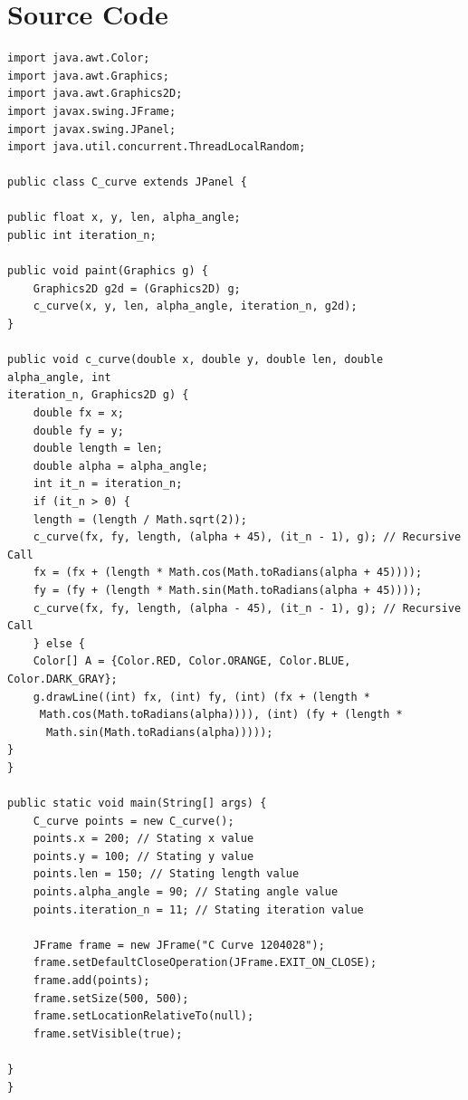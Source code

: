 \documentclass[11pt]{report}
\begin{document}
\section{Source Code}
\begin{lstlisting}
import java.awt.Color;
import java.awt.Graphics;
import java.awt.Graphics2D;
import javax.swing.JFrame;
import javax.swing.JPanel;
import java.util.concurrent.ThreadLocalRandom;

public class C_curve extends JPanel {

public float x, y, len, alpha_angle;
public int iteration_n;

public void paint(Graphics g) {
	Graphics2D g2d = (Graphics2D) g;
	c_curve(x, y, len, alpha_angle, iteration_n, g2d);
}

public void c_curve(double x, double y, double len, double alpha_angle, int 
iteration_n, Graphics2D g) {
	double fx = x; 
	double fy = y;
	double length = len;
	double alpha = alpha_angle;
	int it_n = iteration_n;
	if (it_n > 0) {
	length = (length / Math.sqrt(2));
	c_curve(fx, fy, length, (alpha + 45), (it_n - 1), g); // Recursive Call
	fx = (fx + (length * Math.cos(Math.toRadians(alpha + 45))));
	fy = (fy + (length * Math.sin(Math.toRadians(alpha + 45))));
	c_curve(fx, fy, length, (alpha - 45), (it_n - 1), g); // Recursive Call
	} else {
	Color[] A = {Color.RED, Color.ORANGE, Color.BLUE, Color.DARK_GRAY};
	g.drawLine((int) fx, (int) fy, (int) (fx + (length *
	 Math.cos(Math.toRadians(alpha)))), (int) (fy + (length *
	  Math.sin(Math.toRadians(alpha)))));
}
}

public static void main(String[] args) {
	C_curve points = new C_curve();
	points.x = 200; // Stating x value
	points.y = 100; // Stating y value
	points.len = 150; // Stating length value
	points.alpha_angle = 90; // Stating angle value
	points.iteration_n = 11; // Stating iteration value
	
	JFrame frame = new JFrame("C Curve 1204028");
	frame.setDefaultCloseOperation(JFrame.EXIT_ON_CLOSE);
	frame.add(points);
	frame.setSize(500, 500);
	frame.setLocationRelativeTo(null);
	frame.setVisible(true);

}
}

\end{lstlisting}
\clearpage
\end{document}
